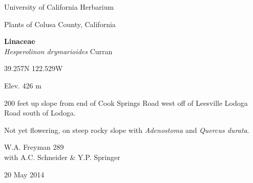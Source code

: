 \documentclass[letterpaper,10pt]{article}
\begin{document}
\begin{minipage}[t]{0.40\textwidth}

\begin{center}
University of California Herbarium \\
\begin{large}
Plants of Colusa County, California \\
\end{large}
\vspace{\baselineskip}
\textbf{Linaceae} \\
\textit{Hesperolinon drymarioides} Curran\\
\end{center}

\begin{footnotesize}

\begin{multicols}{2}
39.257\textdegree N 122.529\textdegree W
\columnbreak
\begin{flushright}
Elev. 426 m
\end{flushright}
\end{multicols}

200 feet up slope from end of Cook Springs Road west off of Leesville Lodoga Road south of Lodoga.
\vspace{\baselineskip}

Not yet flowering, on steep rocky slope with \textit{Adenostoma} and \textit{Quercus durata}.

\begin{multicols}{2}
W.A. Freyman 289 \\
with A.C. Schneider \& Y.P. Springer
\columnbreak
\begin{flushright}
20 May 2014
\end{flushright}
\end{multicols}

\end{footnotesize}

\end{minipage}

\vspace{2cm}
%
%

%
%
\end{document}
